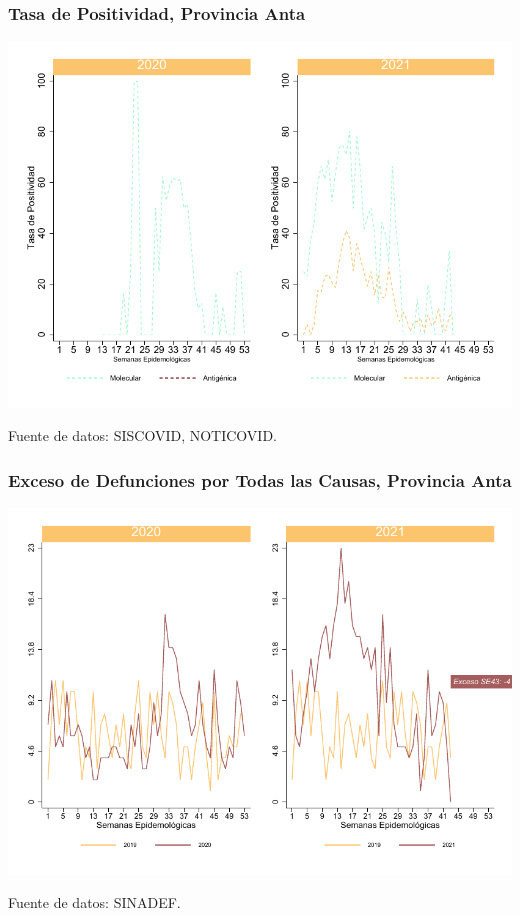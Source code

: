 \documentclass[xcolor=table]{beamer}
\begin{document}
\begin{frame}
	\frametitle{Tasa de Positividad, Provincia Anta}
	\vspace{-.5cm}
	\begin{center}
		\includegraphics[width=0.8\linewidth, trim={0cm .5cm 0cm 0.2cm},clip]{../figuras/positividad_20_21_2.pdf}
	\end{center}
	{\tiny Fuente de datos: SISCOVID, NOTICOVID.}
\end{frame}

\begin{frame}
	\frametitle{Exceso de Defunciones por Todas las Causas, Provincia Anta}
	\vspace{-.5cm}
	\begin{center}
		\includegraphics[width=0.8\linewidth, trim={0cm .5cm 0cm 0.2cm},clip]{../figuras/exceso_2.pdf}
	\end{center}
	{\tiny Fuente de datos: SINADEF.}
	
	\hyperlink{indicadores_provinciales}{}
\end{frame}
\end{document}
